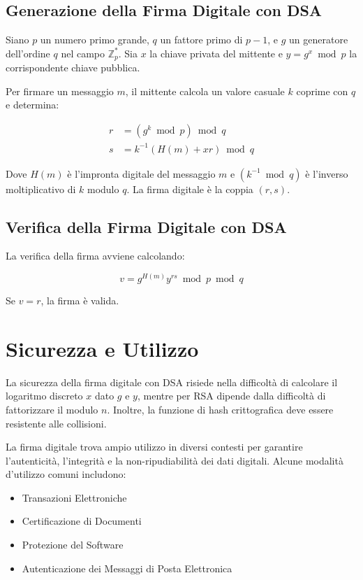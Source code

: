 \documentclass[a4paper,12pt]{report}
\begin{document}
\subsection{Generazione della Firma Digitale con DSA}
Siano $p$ un numero primo grande, $q$ un fattore primo di $p - 1$, e $g$ un generatore dell'ordine $q$ nel campo $\mathbb{Z}_p^*$. Sia $x$ la chiave privata del mittente e $y = g^x \bmod p$ la corrispondente chiave pubblica.

Per firmare un messaggio $m$, il mittente calcola un valore casuale $k$ coprime con $q$ e determina:

\begin{align*}
r &= (g^k \bmod p) \bmod q \\
s &= k^{-1}(H(m) + xr) \bmod q
\end{align*}

Dove $H(m)$ è l'impronta digitale del messaggio $m$ e $(k^{-1} \bmod q)$ è l'inverso moltiplicativo di $k$ modulo $q$. La firma digitale è la coppia $(r, s)$.

\subsection{Verifica della Firma Digitale con DSA}
La verifica della firma avviene calcolando:

\[
v = g^{H(m)}y^{rs} \bmod p \bmod q
\]

Se $v = r$, la firma è valida.

\section{Sicurezza e Utilizzo}
La sicurezza della firma digitale con DSA risiede nella difficoltà di calcolare il logaritmo discreto $x$ dato $g$ e $y$, mentre per RSA dipende dalla difficoltà di fattorizzare il modulo $n$. Inoltre, la funzione di hash crittografica deve essere resistente alle collisioni.

La firma digitale trova ampio utilizzo in diversi contesti per garantire l'autenticità, l'integrità e la non-ripudiabilità dei dati digitali. Alcune modalità d'utilizzo comuni includono:

\begin{itemize}
    \item Transazioni Elettroniche
    \item Certificazione di Documenti
    \item Protezione del Software
    \item Autenticazione dei Messaggi di Posta Elettronica
\end{itemize}
\end{document}

